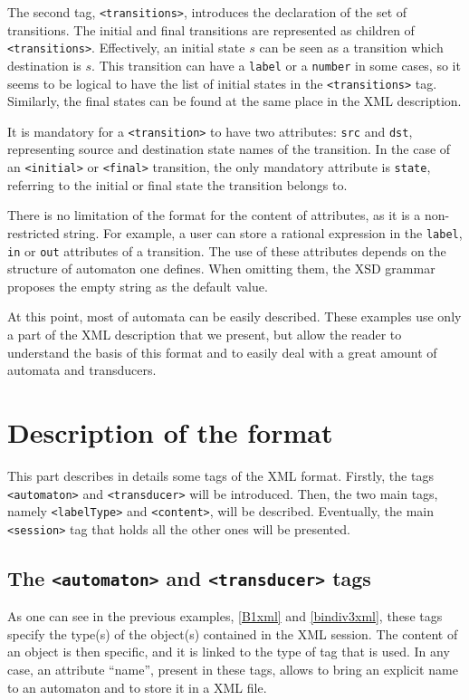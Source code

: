 \documentclass[a4paper]{article}
\newcommand{\xtag}[1]{\texttt{<#1>}}
\newcommand{\xattr}[1]{\texttt{#1}}
\begin{document}
The second tag, \xtag{transitions}, introduces the declaration
of the set of transitions. The initial and final
transitions are represented as children of
\xtag{transitions}. Effectively, an initial state $s$ can be seen as a transition
which destination is $s$. This transition can have a \xattr{label} or a
\xattr{number} in some cases, so it seems to be logical to have the list of
initial states in the \xtag{transitions} tag.  Similarly, the final
states can be found at the same place in the XML description.

It is mandatory for a \xtag{transition} to have two attributes:
\xattr{src} and \xattr{dst}, representing source and destination state
names of the
transition. In the case of an \xtag{initial} or \xtag{final} transition,
the only mandatory attribute is \xattr{state}, referring to the initial
or final state the transition belongs to.

There is no limitation of the format for the content of attributes, as
it is a non-restricted string. For example, a user can store a
rational expression in the \xattr{label}, \xattr{in} or \xattr{out}
attributes of a transition. The use of these attributes depends on the
structure of automaton one defines. When omitting them, the XSD
grammar proposes the empty string as the default value.

At this point, most of automata can be easily described. These
examples use only a part of the XML description that we present, but
allow the reader to understand the basis of this format and to easily
deal with a great amount of automata and transducers.

\section{Description of the format}

This part describes in details some tags of the XML format.  Firstly,
the tags \xtag{automaton} and \xtag{transducer} will be introduced.
Then, the two main tags, namely \xtag{labelType} and \xtag{content}, will be
described.  Eventually, the main \xtag{session} tag that holds all the
other ones will be presented.

\subsection{The \xtag{automaton} and \xtag{transducer} tags}

As one can see in the previous examples, \autoref{B1xml} and
\autoref{bindiv3xml}, these tags specify the type(s) of the object(s)
contained in the XML session. The content of an object is then
specific, and it is linked to the type of tag that is used.  In any
case, an attribute ``name'', present in these tags, allows to bring an
explicit name to an automaton and to store it in a XML file.
\end{document}
